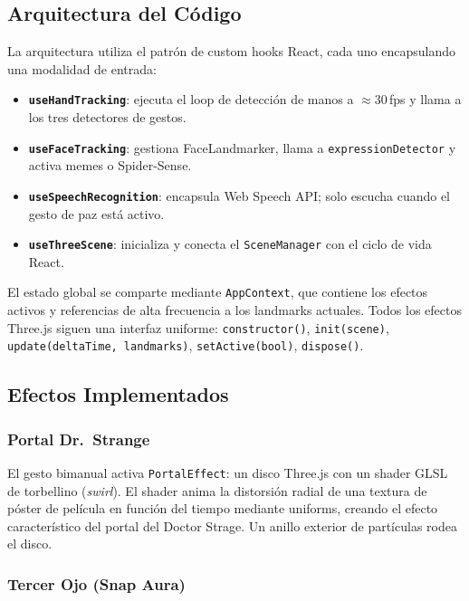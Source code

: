 \documentclass[11pt]{article}
\begin{document}
\subsection{Arquitectura del Código}

La arquitectura utiliza el patrón de custom hooks React, cada uno encapsulando una modalidad de entrada:

\begin{itemize}
    \item \textbf{\texttt{useHandTracking}}: ejecuta el loop de detección de manos a $\approx$30\,fps y llama a los tres detectores de gestos.
    \item \textbf{\texttt{useFaceTracking}}: gestiona FaceLandmarker, llama a \texttt{expressionDetector} y activa memes o Spider-Sense.
    \item \textbf{\texttt{useSpeechRecognition}}: encapsula Web Speech API; solo escucha cuando el gesto de paz está activo.
    \item \textbf{\texttt{useThreeScene}}: inicializa y conecta el \texttt{SceneManager} con el ciclo de vida React.
\end{itemize}

El estado global se comparte mediante \texttt{AppContext}, que contiene los efectos activos y referencias de alta frecuencia a los landmarks actuales. Todos los efectos Three.js siguen una interfaz uniforme: \texttt{constructor()}, \texttt{init(scene)}, \texttt{update(deltaTime, landmarks)}, \texttt{setActive(bool)}, \texttt{dispose()}.

\subsection{Efectos Implementados}

\subsubsection{Portal Dr.~Strange}

El gesto bimanual activa \texttt{PortalEffect}: un disco Three.js con un shader GLSL de torbellino (\textit{swirl}). El shader anima la distorsión radial de una textura de póster de película en función del tiempo mediante uniforms, creando el efecto característico del portal del Doctor Strage. Un anillo exterior de partículas rodea el disco.

\subsubsection{Tercer Ojo (Snap Aura)}
\end{document}
